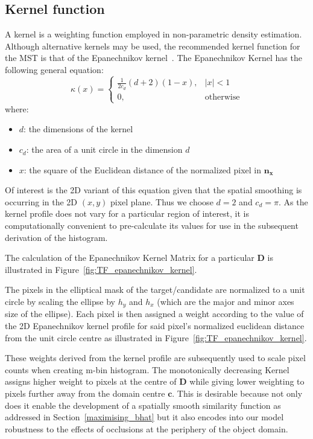 \subsection{Kernel function}
A kernel is a weighting function employed in non-parametric density estimation.
Although alternative kernels may be used, the recommended kernel function for the MST is that of the
Epanechnikov kernel~\cite{Comaniciu2002}.
The Epanechnikov Kernel has the following general equation:
\begin{equation}
    \kappa(x)=
    \begin{cases}
        \frac{1}{2c_d}(d+2)(1-x), & |x|<1 \\
        0, & \text{otherwise}
    \end{cases}
\end{equation}
where:
\begin{itemize}
   \item $d$: the dimensions of the kernel
   \item $c_d$: the area of a unit circle in the dimension $d$
   \item $x$: the square of the Euclidean distance of the normalized pixel in
       $\mathbf{n_x}$
\end{itemize}

Of interest is the 2D variant of this equation given that the spatial smoothing
is occurring in the 2D $(x,y)$ pixel plane. Thus we choose $d=2$ and $c_d=\pi$.
As the kernel profile does not vary for a particular region of interest, it is
computationally convenient to pre-calculate its values for use in the subsequent
derivation of the histogram.

The calculation of the Epanechnikov Kernel Matrix for a particular $\mathbf{D}$ is
illustrated in Figure~\ref{fig:TF_epanechnikov_kernel}.


The pixels in the elliptical mask of the target/candidate are normalized to a unit
circle by scaling the ellipse by $h_y$ and $h_x$ (which are the major and minor
axes size of the ellipse). Each pixel is then assigned a weight according to the
value of the 2D Epanechnikov kernel profile for said pixel's normalized euclidean
distance from the unit circle centre as illustrated in Figure~\ref{fig:TF_epanechnikov_kernel}.

These weights derived from the kernel profile are subsequently used to scale
pixel counts when creating m-bin histogram. The monotonically decreasing Kernel
assigns higher weight to pixels at the centre of $\mathbf{D}$ while giving lower
weighting to pixels further away from the domain centre $\mathbf{c}$. 
This is desirable because not only does it enable the development of a spatially
smooth similarity function as addressed in Section~\ref{maximising_bhat} but it
also encodes into our model robustness to the effects of occlusions at the
periphery of the object domain.

